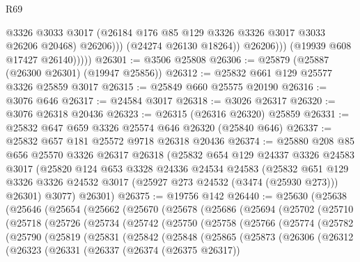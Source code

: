\begin{lexlean}{R69}
\begin{coremodule}
                          @3326
                          @3033
                          @3017
                          (@26184 @176 @85 @129 @3326 @3326 @3017 @3033 @26206 @20468)
                          @26206)))
                    (@24274 @26130 @18264))
                  @26206)))
            (@19939 @608 @17427 @26140)))))
@26301 := @3506 @25808
@26306 := @25879 (@25887 (@26300 @26301) (@19947 @25856))
@26312 := @25832 @661 @129 @25577 @3326 @25859 @3017
@26315 := @25849 @660 @25575 @20190
@26316 := @3076 @646
@26317 := @24584 @3017
@26318 := @3026 @26317
@26320 := @3076 @26318 @20436
@26323 := @26315 (@26316 @26320) @25859
@26331 := @25832 @647 @659 @3326 @25574 @646 @26320 (@25840 @646)
@26337 := @25832 @657 @181 @25572 @9718 @26318 @20436
@26374 := @25880
    @208
    @85
    @656
    @25570
    @3326
    @26317
    @26318
    (@25832
      @654
      @129
      @24337
      @3326
      @24583
      @3017
      (@25820
        @124
        @653
        @3328
        @24336
        @24534
        @24583
        (@25832
          @651
          @129
          @3326
          @3326
          @24532
          @3017
          (@25927 @273 @24532 (@3474 (@25930 @273)))
          @26301)
        @3077)
      @26301)
@26375 := @19756 @142
@26440 := @25630
    (@25638
      (@25646
        (@25654
          (@25662
            (@25670
              (@25678
                (@25686
                  (@25694
                    (@25702
                      (@25710
                        (@25718
                          (@25726
                            (@25734
                              (@25742
                                (@25750
                                  (@25758
                                    (@25766
                                      (@25774
                                        (@25782
                                          (@25790
                                            (@25819
                                              (@25831
                                                (@25842
                                                  (@25848
                                                    (@25865
                                                      (@25873
                                                        (@26306
                                                          (@26312
                                                            (@26323
                                                              (@26331
                                                                (@26337
                                                                  (@26374 (@26375 @26317))

\end{coremodule}
\end{lexlean}
